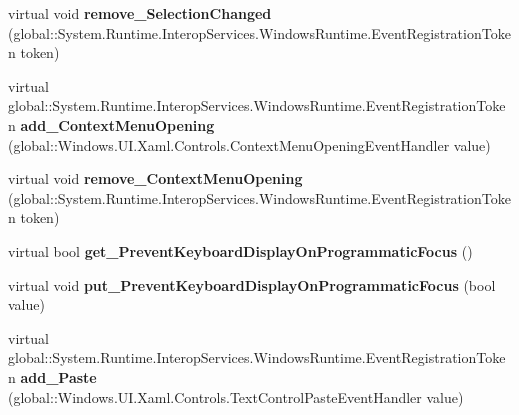 \begin{DoxyCompactItemize}
\item 
\mbox{\label{class_windows_1_1_u_i_1_1_xaml_1_1_controls_1_1_text_box_ab695fdfc9633cf4e369d19dceb2d3327}} 
virtual void {\bfseries remove\+\_\+\+Selection\+Changed} (global\+::\+System.\+Runtime.\+Interop\+Services.\+Windows\+Runtime.\+Event\+Registration\+Token token)
\item 
\mbox{\label{class_windows_1_1_u_i_1_1_xaml_1_1_controls_1_1_text_box_ab836344ac1b9e4cb88bf838f48407e7c}} 
virtual global\+::\+System.\+Runtime.\+Interop\+Services.\+Windows\+Runtime.\+Event\+Registration\+Token {\bfseries add\+\_\+\+Context\+Menu\+Opening} (global\+::\+Windows.\+U\+I.\+Xaml.\+Controls.\+Context\+Menu\+Opening\+Event\+Handler value)
\item 
\mbox{\label{class_windows_1_1_u_i_1_1_xaml_1_1_controls_1_1_text_box_ad3a3c299db3a774e1db87983c4ee1b5c}} 
virtual void {\bfseries remove\+\_\+\+Context\+Menu\+Opening} (global\+::\+System.\+Runtime.\+Interop\+Services.\+Windows\+Runtime.\+Event\+Registration\+Token token)
\item 
\mbox{\label{class_windows_1_1_u_i_1_1_xaml_1_1_controls_1_1_text_box_ab8c87aab30bc9eb47b16617cd979f283}} 
virtual bool {\bfseries get\+\_\+\+Prevent\+Keyboard\+Display\+On\+Programmatic\+Focus} ()
\item 
\mbox{\label{class_windows_1_1_u_i_1_1_xaml_1_1_controls_1_1_text_box_aeb5452275c88b059cb6fcab37f2c0547}} 
virtual void {\bfseries put\+\_\+\+Prevent\+Keyboard\+Display\+On\+Programmatic\+Focus} (bool value)
\item 
\mbox{\label{class_windows_1_1_u_i_1_1_xaml_1_1_controls_1_1_text_box_a228a83caf2e3f6ac77d710ba279dfb6e}} 
virtual global\+::\+System.\+Runtime.\+Interop\+Services.\+Windows\+Runtime.\+Event\+Registration\+Token {\bfseries add\+\_\+\+Paste} (global\+::\+Windows.\+U\+I.\+Xaml.\+Controls.\+Text\+Control\+Paste\+Event\+Handler value)
\item 
\mbox{\label{class_windows_1_1_u_i_1_1_xaml_1_1_controls_1_1_text_box_affd66f6fbd07759509d7f75dab0e7186}} 

\end{DoxyCompactItemize}
